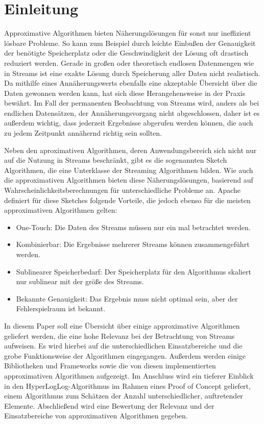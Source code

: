 \section{Einleitung}

Approximative Algorithmen bieten Näherungslösungen für sonst nur ineffizient lösbare Probleme.
So kann zum Beispiel durch leichte Einbußen der Genauigkeit der benötigte Speicherplatz oder die Geschwindigkeit der Lösung oft drastisch reduziert werden.
Gerade in großen oder theoretisch endlosen Datenmengen wie in Streams ist eine exakte Lösung durch Speicherung aller Daten nicht realistisch.
Da mithilfe eines Annäherungswerts ebenfalls eine akzeptable Übersicht über die Daten gewonnen werden kann, hat sich diese Herangehensweise in der Praxis bewährt.
Im Fall der permanenten Beobachtung von Streams wird, anders als bei endlichen Datensätzen, der Annäherungsvorgang nicht abgeschlossen, daher ist es außerdem wichtig, dass jederzeit Ergebnisse abgerufen werden können, die auch zu jedem Zeitpunkt annähernd richtig sein sollten.

Neben den aproximativen Algorithmen, deren Anwendungsbereich sich nicht nur auf die Nutzung in Streams beschränkt, gibt es die sogenannten Sketch Algorithmen, die eine Unterklasse der Streaming Algorithmen bilden.
Wie auch die approximativen Algorithmen bieten diese Näherungslösungen, basierend auf Wahrscheinlichkeitsberechnungen für unterschiedliche Probleme an.
Apache \cite{apachedatasketches} definiert für diese Sketches folgende Vorteile, die jedoch ebenso für die meisten approximativen Algorithmen gelten:

\begin{itemize}
	\item One-Touch: Die Daten des Streams müssen nur ein mal betrachtet werden.
	\item Kombinierbar: Die Ergebnisse mehrerer Streams können zusammengeführt werden.
	\item Sublinearer Speicherbedarf: Der Speicherplatz für den Algorithmus skaliert nur sublinear mit der größe des Streams.
	\item Bekannte Genauigkeit: Das Ergebnis muss nicht optimal sein, aber der Fehlerspielraum ist bekannt.
\end{itemize}

In diesem Paper soll eine Übersicht über einige approximative Algorithmen geliefert werden, die eine hohe Relevanz bei der Betrachtung von Streams aufweisen.
Es wird hierbei auf die unterschiedlichen Einsatzbereiche und die grobe Funktionsweise der Algorithmen eingegangen.
Außerdem werden einige Bibliotheken und Frameworks sowie die von diesen implementierten approximativen Algorithmen aufgezeigt.
Im Anschluss wird ein tieferer Einblick in den HyperLogLog-Algorithmus im Rahmen eines Proof of Concept geliefert, einem Algorithmus zum Schätzen der Anzahl unterschiedlicher, auftretender Elemente.
Abschließend wird eine Bewertung der Relevanz und der Einsatzbereiche von approximativen Algorithmen gegeben.
